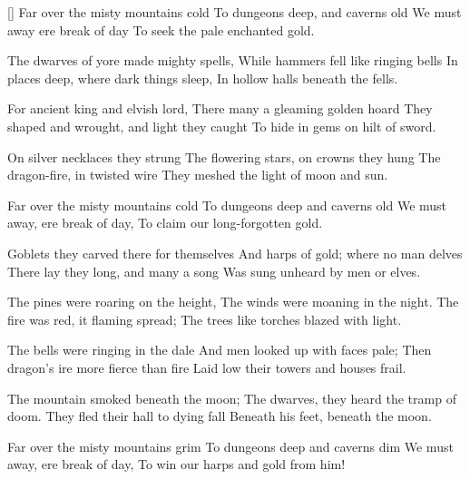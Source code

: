 \begin{intersong*}
\end{intersong*}
[]
\beginverse
Far over the misty mountains cold
To dungeons deep, and caverns old
We must away ere break of day
To seek the pale enchanted gold.
\endverse

\beginverse
The dwarves of yore made mighty spells,
While hammers fell like ringing bells
In places deep, where dark things sleep,
In hollow halls beneath the fells.
\endverse

\beginverse
For ancient king and elvish lord,
There many a gleaming golden hoard
They shaped and wrought, and light they caught
To hide in gems on hilt of sword.
\endverse

\beginverse
On silver necklaces they strung
The flowering stars, on crowns they hung
The dragon-fire, in twisted wire
They meshed the light of moon and sun.
\endverse

\beginverse
Far over the misty mountains cold
To dungeons deep and caverns old
We must away, ere break of day,
To claim our long-forgotten gold.
\endverse

\beginverse
Goblets they carved there for themselves
And harps of gold; where no man delves
There lay they long, and many a song
Was sung unheard by men or elves.
\endverse

\beginverse
The pines were roaring on the height,
The winds were moaning in the night.
The fire was red, it flaming spread;
The trees like torches blazed with light.
\endverse

\beginverse
The bells were ringing in the dale
And men looked up with faces pale;
Then dragon's ire more fierce than fire
Laid low their towers and houses frail.
\endverse

\beginverse
The mountain smoked beneath the moon;
The dwarves, they heard the tramp of doom.
They fled their hall to dying fall
Beneath his feet, beneath the moon.
\endverse

\beginverse
Far over the misty mountains grim
To dungeons deep and caverns dim
We must away, ere break of day,
To win our harps and gold from him!
\endverse
\endsong
